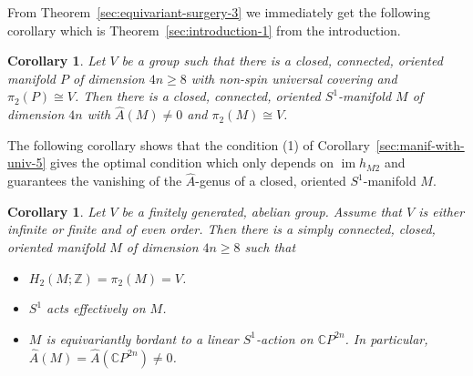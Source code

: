 \documentclass[a4paper, 11pt]{amsart}
\newtheorem{corollary}[theorem]{Corollary}
\theoremstyle{definition}
\theoremstyle{remark}
\numberwithin{equation}{section}
\DeclareMathOperator{\image}{im}
\begin{document}
From Theorem~\ref{sec:equivariant-surgery-3} we immediately get the following corollary which is Theorem~\ref{sec:introduction-1} from the introduction.

\begin{corollary}
  Let \(V\) be a group such that there is a closed, connected, oriented manifold \(P\) of dimension \(4n\geq 8\) with non-spin universal covering and \(\pi_2(P)\cong V\).
  Then there is a closed, connected, oriented \(S^1\)-manifold \(M\) of dimension \(4n\) with \(\hat{A}(M)\neq 0\) and \(\pi_2(M)\cong V\).
\end{corollary}

The following corollary shows that the condition (1) of Corollary~\ref{sec:manif-with-univ-5} gives the optimal condition which only depends on \(\image h_{M2}\) and guarantees the vanishing of the \(\hat{A}\)-genus of a closed, oriented \(S^1\)-manifold \(M\).

\begin{corollary}
  \label{sec:equivariant-surgery-1}
  Let \(V\) be a finitely generated, abelian group.
  Assume that \(V\) is either infinite or finite and of even order.
  Then there is a simply connected, closed, oriented manifold \(M\) of dimension \(4n\geq 8\) such that
  \begin{itemize}
  \item \(H_2(M;\mathbb{Z})=\pi_2(M)=V\).
  \item \(S^1\) acts effectively on \(M\).
  \item \(M\) is equivariantly bordant to a linear \(S^1\)-action on \(\mathbb{C}P^{2n}\). In particular, \(\hat{A}(M)=\hat{A}(\mathbb{C} P^{2n})\neq 0\).
  \end{itemize}
\end{corollary}
\end{document}
